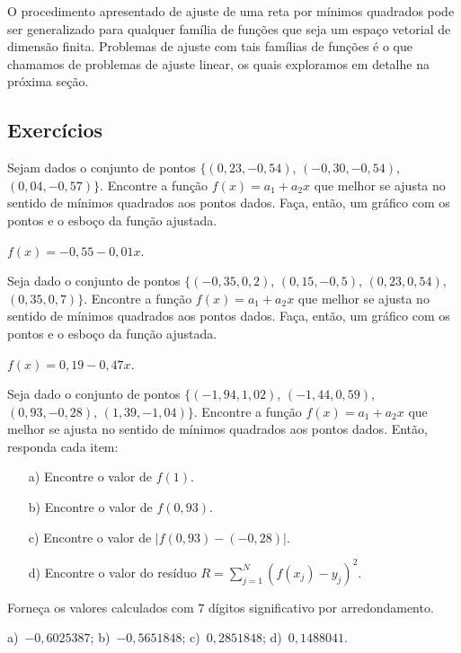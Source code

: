 O procedimento apresentado de ajuste de uma reta por mínimos quadrados pode ser generalizado para qualquer família de funções que seja um espaço vetorial de dimensão finita. Problemas de ajuste com tais famílias de funções é o que chamamos de problemas de ajuste linear, os quais exploramos em detalhe na próxima seção.

\subsection*{Exercícios}

\begin{exer}
  Sejam dados o conjunto de pontos $\{(0,23, -0,54)$, $(-0,30, -0,54)$, $(0,04, -0,57)\}$. Encontre a função $f(x) = a_1 + a_2x$ que melhor se ajusta no sentido de mínimos quadrados aos pontos dados. Faça, então, um gráfico com os pontos e o esboço da função ajustada.
\end{exer}
\begin{resp}
  
    $f(x) = -0,55 -0,01x$.
  
\end{resp}

\begin{exer}
  Seja dado o conjunto de pontos $\{(-0,35, 0,2)$, $(0,15, -0,5)$, $(0,23, 0,54)$, $(0,35, 0,7)\}$. Encontre a função $f(x) = a_1 + a_2x$ que melhor se ajusta no sentido de mínimos quadrados aos pontos dados. Faça, então, um gráfico com os pontos e o esboço da função ajustada.
\end{exer}
\begin{resp}
  
    $f(x) = 0,19 - 0,47x$.
  
\end{resp}

\begin{exer}
  Seja dado o conjunto de pontos $\{(-1,94, 1,02)$, $(-1,44, 0,59)$, $(0,93, -0,28)$, $(1,39, -1,04)\}$. Encontre a função $f(x) = a_1 + a_2x$ que melhor se ajusta no sentido de mínimos quadrados aos pontos dados. Então, responda cada item:
  \begin{itemize}
  \item[a)] Encontre o valor de $f(1)$.
  \item[b)] Encontre o valor de $f(0,93)$.
  \item[c)] Encontre o valor de $|f(0,93) - (- 0,28)|$.
  \item[d)] Encontre o valor do resíduo $R = \sum_{j=1}^N (f(x_j)-y_j)^2$.
  \end{itemize}
Forneça os valores calculados com $7$ dígitos significativo por arredondamento.
\end{exer}
\begin{resp}
  
    a)~$-0,6025387$; b)~$-0,5651848$; c)~$0,2851848$; d)~$0,1488041$.
  
\end{resp}

